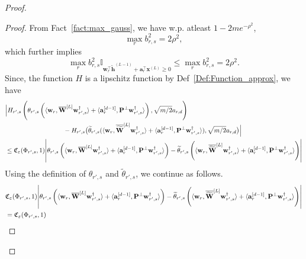 \begin{claim}
\begin{proof}
\begin{proof}
					From Fact~\ref{fact:max_gauss}, we have w.p. atleast $1 - 2me^{-\rho^2}$,
					\begin{equation*}
						\max_{r} b^{2}_{r, s} = 2 \rho^2,
					\end{equation*}
					which further implies
					\begin{equation*}
						\max_{r} b^{2}_{r, s} \mathbb{I}_{\mathbf{w}_r^{\top} \widetilde{\mathbf{h}}^{(L-1)} + \mathbf{a}_r^{\top} \mathbf{x}^{(L)} \ge 0} \le \max_{r} b^{2}_{r, s}  = 2 \rho^2.
					\end{equation*}
					Since, the function $H$ is a lipschitz function by Def~\ref{Def:Function_approx}, we have
					\begin{align}
						&\Big|H_{r', s}\left(\theta_{r', s} \left(\langle \mathbf{w}_{r}, \overline{\mathbf{W}}^{[L]} \mathbf{w}_{r', s}^{\dagger}\rangle + \langle \mathbf{a}_{r}^{[d-1]},  \mathbf{P}^{\perp}\mathbf{w}_{r', s}^{\dagger}  \rangle\right), \sqrt{m/2} a_{r, d}\right) \\&
						\quad\quad\quad\quad\quad\quad\quad\quad\quad- H_{r', s}\big(\widetilde{\theta}_{r', s} (\langle \mathbf{w}_{r}, \overline{\widetilde{\mathbf{W}}}^{[L]} \mathbf{w}_{r', s}^{\dagger}\rangle + \langle \mathbf{a}_{r}^{[d-1]},  \mathbf{P}^{\perp}\mathbf{w}_{r', s}^{\dagger}  \rangle), \sqrt{m/2} a_{r, d}\big)\Big| 
						\\& \le \mathfrak{C}_{\varepsilon}(\Phi_{r', s}, 1) \abs{\theta_{r', s} \left(\langle \mathbf{w}_{r}, \overline{\mathbf{W}}^{[L]} \mathbf{w}_{r', s}^{\dagger}\rangle + \langle \mathbf{a}_{r}^{[d-1]},  \mathbf{P}^{\perp}\mathbf{w}_{r', s}^{\dagger}  \rangle\right) - \widetilde{\theta}_{r', s} \left(\langle \mathbf{w}_{r}, \overline{\widetilde{\mathbf{W}}}^{[L]} \mathbf{w}_{r', s}^{\dagger}\rangle + \langle \mathbf{a}_{r}^{[d-1]},  \mathbf{P}^{\perp}\mathbf{w}_{r', s}^{\dagger}  \rangle\right)} \nonumber
					\end{align}
					Using the definition of $\theta_{r', s}$ and $\widetilde{\theta}_{r' ,s}$, we continue as follows.
					\begin{align}
						&\mathfrak{C}_{\varepsilon}(\Phi_{r', s}, 1) \abs{\theta_{r', s} \left(\langle \mathbf{w}_{r}, \overline{\mathbf{W}}^{[L]} \mathbf{w}_{r', s}^{\dagger}\rangle + \langle \mathbf{a}_{r}^{[d-1]},  \mathbf{P}^{\perp}\mathbf{w}_{r', s}^{\dagger}  \rangle\right) - \widetilde{\theta}_{r', s} \left(\langle \mathbf{w}_{r}, \overline{\widetilde{\mathbf{W}}}^{[L]} \mathbf{w}_{r', s}^{\dagger}\rangle + \langle \mathbf{a}_{r}^{[d-1]},  \mathbf{P}^{\perp}\mathbf{w}_{r', s}^{\dagger}  \rangle\right)} \nonumber\\&= \mathfrak{C}_{\varepsilon}(\Phi_{r', s}, 1) 

\end{align}
\end{proof}
\end{proof}
\end{claim}
